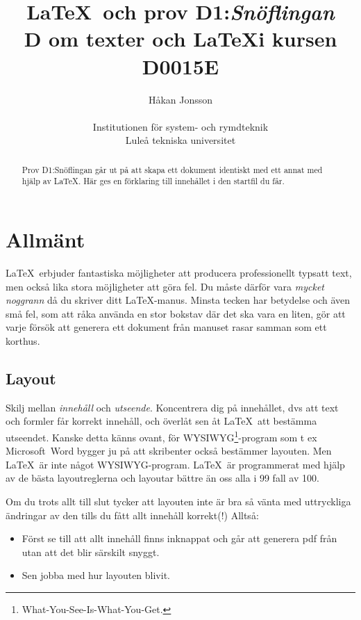 \documentclass[a4paper,12pt]{article}
\title{\LaTeX\ och prov D1:\emph{Snöflingan} \\
       D om texter och \LaTeX i kursen D0015E}
\author{Håkan Jonsson\\ ~\\ Institutionen för system- och
  rymdteknik \\ Luleå tekniska universitet}
\begin{document}
\maketitle

\begin{abstract}
  Prov D1:Snöflingan går ut på att skapa ett dokument identiskt med
  ett annat med hjälp av \LaTeX. Här ges en förklaring till innehållet
  i den startfil  du får.  
\end{abstract}

\section{Allmänt}

\LaTeX\ erbjuder fantastiska möjligheter att producera professionellt
typsatt text, men också lika stora möjligheter att göra fel. Du måste
därför vara \emph{mycket noggrann} då du skriver ditt
\LaTeX-manus. Minsta tecken har betydelse och även små fel, som att
råka använda en stor bokstav där det ska vara en liten, gör att varje
försök att generera ett dokument från manuset rasar samman som ett
korthus.
%
\begin{center}
  \noindent
\end{center}

\subsection{Layout}

Skilj mellan \emph{innehåll} och \emph{utseende}. Koncentrera dig på
innehållet, dvs att text och formler får korrekt innehåll, och överlåt
sen åt \LaTeX\ att bestämma utseendet. Kanske detta känns ovant, för
WYSIWYG\footnote{What-You-See-Is-What-You-Get.}-program som t ex
Microsoft~Word bygger ju på att skribenter också bestämmer
layouten. Men \LaTeX\ är inte något WYSIWYG-program. \LaTeX\ är
programmerat med hjälp av de bästa layoutreglerna och layoutar bättre
än oss alla i 99 fall av 100.

Om du trots allt till slut tycker att layouten inte är bra så vänta
med uttryckliga ändringar av den tills du fått allt innehåll
korrekt(!) Alltså:

\begin{itemize}
  \item Först se till att allt innehåll finns inknappat och går att
    generera pdf från utan att det blir särskilt snyggt.
  \item Sen jobba med hur layouten blivit. 
  \end{itemize}
  
\end{document}
